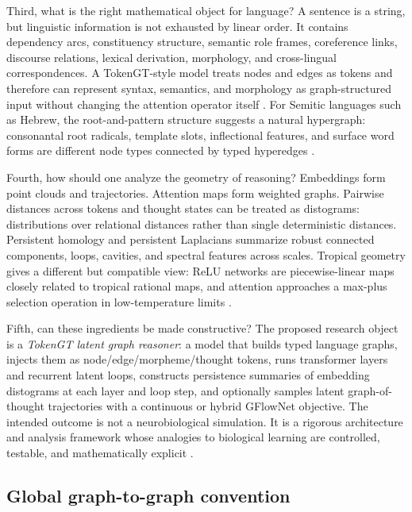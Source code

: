 \documentclass[11pt]{article}
\newcommand{\1}{\mathbf{1}}
\begin{document}
Third, what is the right mathematical object for language? A sentence is a string, but linguistic information is not exhausted by linear order. It contains dependency arcs, constituency structure, semantic role frames, coreference links, discourse relations, lexical derivation, morphology, and cross-lingual correspondences. A TokenGT-style model treats nodes and edges as tokens and therefore can represent syntax, semantics, and morphology as graph-structured input without changing the attention operator itself \cite{KimTokenGT2022}. For Semitic languages such as Hebrew, the root-and-pattern structure suggests a natural hypergraph: consonantal root radicals, template slots, inflectional features, and surface word forms are different node types connected by typed hyperedges \cite{Daya2008,Hatch2025,Samo2026}.

Fourth, how should one analyze the geometry of reasoning? Embeddings form point clouds and trajectories. Attention maps form weighted graphs. Pairwise distances across tokens and thought states can be treated as distograms: distributions over relational distances rather than single deterministic distances. Persistent homology and persistent Laplacians summarize robust connected components, loops, cavities, and spectral features across scales. Tropical geometry gives a different but compatible view: ReLU networks are piecewise-linear maps closely related to tropical rational maps, and attention approaches a max-plus selection operation in low-temperature limits \cite{ZhangTropical2018,Brandenburg2024,HashemiTropicalAttention2025,TransformerTropical2026,Chazal2016,WeiPersistentLaplacian2023,Draganov2024,TDA_NLP_Survey2025}.

Fifth, can these ingredients be made constructive? The proposed research object is a \emph{TokenGT latent graph reasoner}: a model that builds typed language graphs, injects them as node/edge/morpheme/thought tokens, runs transformer layers and recurrent latent loops, constructs persistence summaries of embedding distograms at each layer and loop step, and optionally samples latent graph-of-thought trajectories with a continuous or hybrid GFlowNet objective. The intended outcome is not a neurobiological simulation. It is a rigorous architecture and analysis framework whose analogies to biological learning are controlled, testable, and mathematically explicit \cite{BestaGoT2023,Lahlou2023,Younsi2025,GraphThoughtsSurvey2024}.

\subsection{Global graph-to-graph convention}
\end{document}
